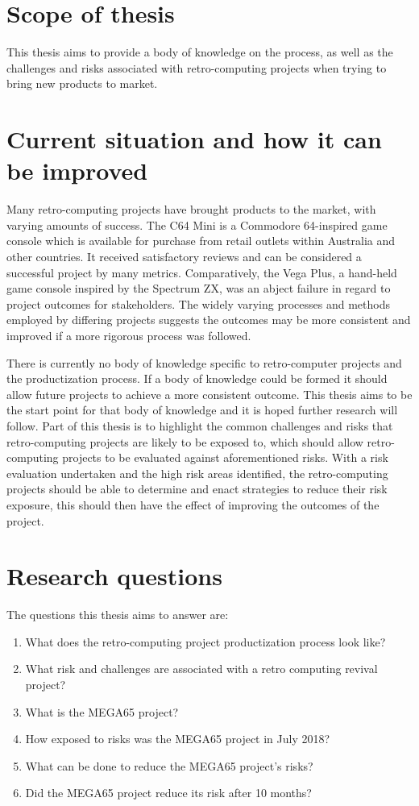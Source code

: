 \section{Scope of thesis}
This thesis aims to provide a body of knowledge on the process, as well as the challenges and risks associated with retro-computing projects when trying to bring new products to market. 


\section{Current situation and how it can be improved}
Many retro-computing projects have brought products to the market, with varying amounts of success. The C64 Mini is a Commodore 64-inspired game console which is available for purchase from retail outlets within Australia and other countries. It received satisfactory reviews and can be considered a successful project by many metrics. Comparatively, the Vega Plus, a hand-held game console inspired by the Spectrum ZX, was an abject failure in regard to project outcomes for stakeholders. The widely varying processes and methods employed by differing projects suggests the outcomes may be more consistent and improved if a more rigorous process was followed. 

There is currently no body of knowledge specific to retro-computer projects and the productization process. If a body of knowledge could be formed it should allow future projects to achieve a more consistent outcome. This thesis aims to be the start point for that body of knowledge and it is hoped further research will follow. Part of this thesis is to highlight the common challenges and risks that retro-computing projects are likely to be exposed to, which should allow retro-computing projects to be evaluated against aforementioned risks. With a risk evaluation undertaken and the high risk areas identified, the retro-computing projects should be able to determine and enact strategies to reduce their risk exposure, this should then have the effect of improving the outcomes of the project.


\section{Research questions}
The questions this thesis aims to answer are:
\begin{enumerate}
\item What does the retro-computing project productization process look like?
\item What risk and challenges are associated with a retro computing revival project?
\item What is the MEGA65 project? 
\item How exposed to risks was the MEGA65 project in July 2018?
\item What can be done to reduce the MEGA65 project's risks?
\item Did the MEGA65 project reduce its risk after 10 months?
\end{enumerate}


